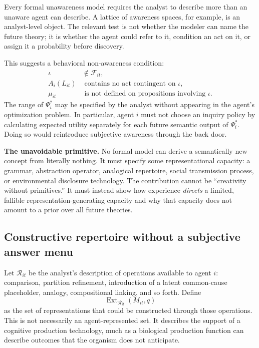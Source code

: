 \documentclass[11pt]{article}
\newcommand{\F}{\mathcal{F}}
\newcommand{\R}{\mathcal{R}}
\newcommand{\Ext}{\operatorname{Ext}}
\begin{document}
	Every formal unawareness model requires the analyst to describe more than an unaware agent can describe.  A lattice of awareness spaces, for example, is an analyst-level object.  The relevant test is not whether the modeler can name the future theory; it is whether the agent could refer to it, condition an act on it, or assign it a probability before discovery.
	
	This suggests a behavioral non-awareness condition:
	\begin{equation}
		\begin{aligned}
			\iota&\notin\F_{it},\\
			A_i(L_{it})&\text{ contains no act contingent on }\iota,\\
			\mu_{it}&\text{ is not defined on propositions involving }\iota.
		\end{aligned}
	\end{equation}
	The range of $\Psi_i^*$ may be specified by the analyst without appearing in the agent's optimization problem.  In particular, agent $i$ must not choose an inquiry policy by calculating expected utility separately for each future semantic output of $\Psi_i^*$.  Doing so would reintroduce subjective awareness through the back door.
	
	\begin{warningbox}
		\textbf{The unavoidable primitive.}
		No formal model can derive a semantically new concept from literally nothing.  It must specify some representational capacity: a grammar, abstraction operator, analogical repertoire, social transmission process, or environmental disclosure technology.  The contribution cannot be ``creativity without primitives.''  It must instead show how experience \emph{directs} a limited, fallible representation-generating capacity and why that capacity does not amount to a prior over all future theories.
	\end{warningbox}
	
	\subsection{Constructive repertoire without a subjective answer menu}
	
	Let $\R_{it}$ be the analyst's description of operations available to agent $i$: comparison, partition refinement, introduction of a latent common-cause placeholder, analogy, compositional linking, and so forth.  Define
	\begin{equation}
		\Ext_{\R_{it}}(M_{it},q)
	\end{equation}
	as the set of representations that could be constructed through those operations.  This is not necessarily an agent-represented set.  It describes the support of a cognitive production technology, much as a biological production function can describe outcomes that the organism does not anticipate.
	
\end{document}
